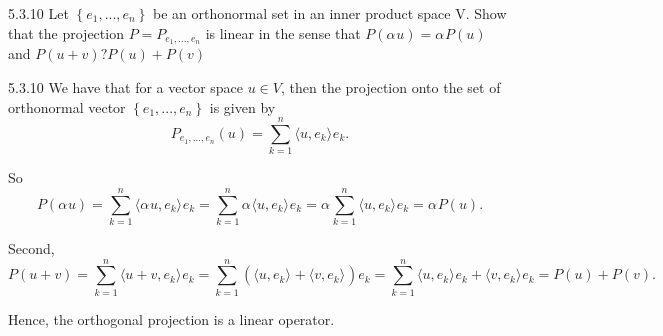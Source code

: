 \documentclass[a4paper,norsk]{article}
\begin{document}
\begin{oppgavebox}{5.3.10}{}
Let $ \left\{ e_1, ..., e_n \right\}  $ be an orthonormal set in an inner product space V. Show  that the projection $ P = P_{e_1, ..., e_n} $ is linear in the sense that $ P \left( \alpha_{}^{} u \right) = \alpha_{}^{} P \left( u \right)   $  and $ P \left( u+v \right) ? P \left( u \right) + P \left( v \right)   $

\begin{proofbox}{5.3.10}{}
  We have that for a vector space $ u \in V $, then the projection onto the set of orthonormal vector $ \left\{ e_1, ..., e_n \right\}  $ is given by
  \[
      P_{e_1, ..., e_n} \left( u \right) = \sum_{k=1}^{n} \langle u, e_k \rangle_{  } e_k.
  \]


  So 
  \[
      P \left( \alpha_{}^{} u \right) = \sum_{k=1}^{n} \langle \alpha_{}^{}u , e_k \rangle_{  }   e_k = \sum_{k=1}^{n} \alpha_{}^{} \langle u, e_k \rangle_{  }  e_k = \alpha_{}^{} \sum_{k=1}^{n} \langle u, e_k \rangle_{  }  e_k = \alpha_{}^{}  P \left( u\right).
  \]

  Second, 
  \[
      P \left( u +v\right) = \sum_{k=1}^{n} \langle u+v, e_k \rangle_{  } e_k = \sum_{k=1}^{n} \left( \langle u, e_k \rangle_{  } + \langle v, e_k \rangle_{  }     \right) e_k = \sum_{k=1}^{n} \langle u, e_k \rangle_{  }  e_k + \langle v, e_k \rangle_{  } e_k = P \left( u \right) + P \left( v \right).
  \]
  
  Hence, the orthogonal projection is a linear operator.
\end{proofbox}
\end{oppgavebox}
\end{document}
